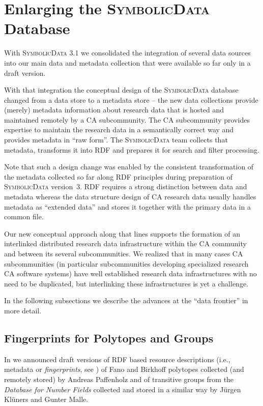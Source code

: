 \documentclass[a4paper,11pt]{article}
\def\SD{\textsc{SymbolicData}}
\begin{document}
\section{Enlarging the {\SD} Database}

With {\SD} 3.1 we consolidated the integration of several data sources into our
main data and metadata collection that were available so far only in a draft
version.

With that integration the conceptual design of the {\SD} database changed from
a data store to a metadata store -- the new data collections provide (merely)
metadata information about research data that is hosted and maintained remotely
by a CA subcommunity. The CA subcommunity provides expertise to maintain the
research data in a semantically correct way and provides metadata in ``raw
form''.  The {\SD} team collects that metadata, transforms it into RDF and
prepares it for search and filter processing. 

Note that such a design change was enabled by the consistent transformation of
the metadata collected so far along RDF principles during preparation of {\SD}
version~3.  RDF requires a strong distinction between data and metadata whereas
the data structure design of CA research data usually handles metadata as
``extended data'' and stores it together with the primary data in a common
file.

Our new conceptual approach along that lines supports the formation of an
interlinked distributed research data infrastructure within the CA community
and between its several subcommunities. We realized that in many cases CA
subcommunities (in particular subcommunities developing specialized research CA
software systems) have well established research data infrastructures with no
need to be duplicated, but interlinking these infrastructures is yet a
challenge. 

In the following subsections we describe the advances at the ``data frontier''
in more detail.
 
\subsection{Fingerprints for Polytopes and Groups}

In \cite{cicm-14} we announced draft versions of RDF based resource
descriptions (i.e., metadata or \emph{fingerprints}, see \cite{icms-16}) of
Fano and Birkhoff polytopes collected (and remotely stored) by Andreas
Paffenholz and of transitive groups from the \emph{Database for Number Fields}
collected and stored in a similar way by J\"urgen Kl\"uners and Gunter Malle.
\end{document}
